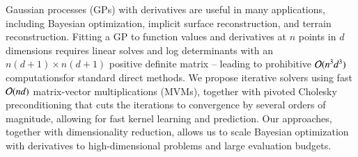 Gaussian processes (GPs) with derivatives are useful in many applications,
including Bayesian optimization, implicit surface reconstruction, and terrain
reconstruction. Fitting a GP to function values and derivatives at $n$ points in
$d$ dimensions requires linear solves and log determinants with an ${n(d+1)
\times n(d+1)}$ positive definite matrix -- leading to prohibitive $\mathcal{O}
(n^3d^3)$ computationsfor standard direct methods. We propose iterative solvers
using fast $\mathcal{O}(nd)$ matrix-vector multiplications (MVMs), together with
pivoted Cholesky preconditioning that cuts the iterations to convergence by
several orders of magnitude, allowing for fast kernel learning and prediction.
Our approaches, together  with dimensionality reduction, allows us to scale
Bayesian optimization with derivatives to high-dimensional problems and large
evaluation budgets.